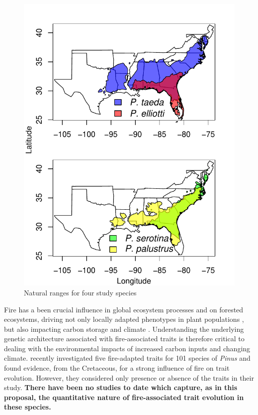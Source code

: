 \begin{figure}
\setlength{\abovecaptionskip}{5pt}
\vspace{-30pt}
\centering
\includegraphics[scale=0.65]{rangemap}
\caption{Natural ranges for four study species}
\label{f:range}
\vspace{-5pt}
\end{figure}


Fire has a been crucial influence in global ecosystem processes and on forested ecosystems, driving not only locally 
adapted phenotypes in plant populations \citep{Lamont:1991js,Vega:2008vk,Midgley:2011dw,Keeley:2011jw,
He:2012bz,Parchman:2012ca}, but also impacting carbon storage and climate \citep{Bowman:2009kp}.  
Understanding the underlying genetic architecture 
associated with fire-associated traits is therefore critical to dealing with the environmental impacts of increased carbon inputs and 
changing climate.  \citet{He:2012bz} recently investigated five fire-adapted traits for 101 species of \emph{Pinus} and found evidence, 
from the Cretaceous, for a strong influence of fire on trait evolution.  However, they considered only presence or absence of the traits in 
their study.  \textbf{There have been no studies to date which capture, as in this proposal, the quantitative nature of fire-associated trait 
evolution in these species.} 

